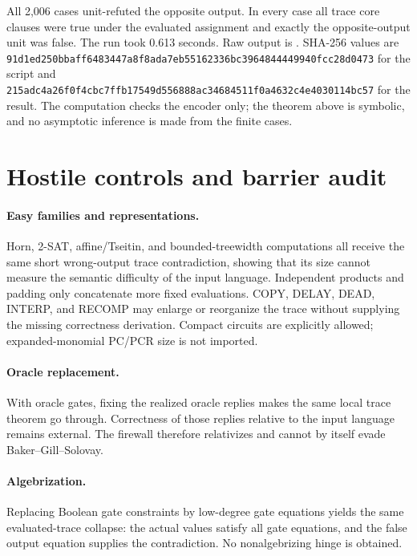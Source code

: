 \documentclass[11pt]{article}
\begin{document}
All 2,006 cases unit-refuted the opposite output.  In every case all trace
core clauses were true under the evaluated assignment and exactly the
opposite-output unit was false.  The run took 0.613 seconds.  Raw output is
.
SHA-256 values are
\texttt{91d1ed250bbaff6483447a8f8ada7eb55162336bc3964844449940fcc28d0473}
for the script and
\texttt{215adc4a26f0f4cbc7ffb17549d556888ac34684511f0a4632c4e4030114bc57}
for the result.  The computation checks the encoder only; the theorem above is
symbolic, and no asymptotic inference is made from the finite cases.

\section{Hostile controls and barrier audit}
\paragraph{Easy families and representations.}
Horn, 2-SAT, affine/Tseitin, and bounded-treewidth computations all receive
the same short wrong-output trace contradiction, showing that its size cannot
measure the semantic difficulty of the input language.  Independent products
and padding only concatenate more fixed evaluations.  COPY, DELAY, DEAD,
INTERP, and RECOMP may enlarge or reorganize the trace without supplying the
missing correctness derivation.  Compact circuits are explicitly allowed;
expanded-monomial PC/PCR size is not imported.

\paragraph{Oracle replacement.}
With oracle gates, fixing the realized oracle replies makes the same local
trace theorem go through.  Correctness of those replies relative to the input
language remains external.  The firewall therefore relativizes and cannot by
itself evade Baker--Gill--Solovay.

\paragraph{Algebrization.}
Replacing Boolean gate constraints by low-degree gate equations yields the
same evaluated-trace collapse: the actual values satisfy all gate equations,
and the false output equation supplies the contradiction.  No
nonalgebrizing hinge is obtained.
\end{document}

